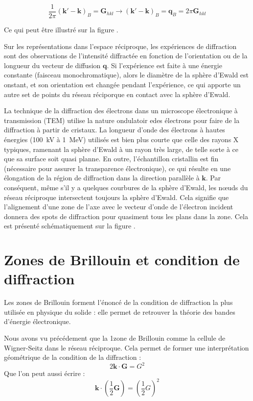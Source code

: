\begin{equation}
    \frac{1}{2\pi} (\mathbf{k'-k})_B = \mathbf{G}_{hkl} \rightarrow
    (\mathbf{k'-k})_B = \mathbf{q}_B = 2 \pi \mathbf{G}_{hkl}
\end{equation}

Ce qui peut être illustré sur la figure \TODO.

Sur les représentations dans l'espace réciproque, les expériences de diffraction 
sont des observations de l'intensité diffractée en fonction de l'orientation
ou de la longueur du vecteur de diffusion $\mathbf{q}$. Si l'expérience est faite
à une énergie constante (faisceau monochromatique), alors le diamètre de la
sphère d'Ewald est onstant, et son orientation est changée pendant l'expérience,
ce qui apporte un autre set de points du réseau réciporque en contact avec la
sphère d'Ewald.

La technique de la diffraction des électrons dans un microscope électronique à
transmission (TEM) utilise la nature ondulatoir edes électrons pour faire de la
diffraction à partir de cristaux. La longueur d'onde des électrons à hautes
énergies (\SI{100}{\kilo\volt} à \SI{1}{\mega\electronvolt}) utilisés est bien
plus courte que celle des rayons X typiques, ramenant la sphère d'Ewald à un
rayon très large, de telle sorte à ce que sa surface soit quasi planne.
En outre, l'échantillon cristallin est fin (nécessaire pour assurer la
transparence électronique), ce qui résulte en une élongation de la région de
diffraction dans la direction parallèle à $\mathbf{k}$.
Par conséquent, même s'il y a quelques courbures de la sphère d'Ewald, les nœuds
du réseau réciproque intersectent toujours la sphère d'Ewald. Cela signifie que
l'alignement d'une zone de l'axe avec le vecteur d'onde de l'électron
incident donnera des spots de diffraction pour quasiment tous les plans dans la
zone. Cela est présenté schématiquement sur la figure \TODO.



\section{Zones de Brillouin et condition de diffraction}

Les zones de Brillouin forment l'énoncé de la condition de diffraction la plus
utilisée en physique du solide : elle permet de retrouver la théorie des bandes
d'énergie électronique.

Nous avons vu précédement que la 1\iere zone de Brillouin comme la cellule de
Wigner-Seitz dans le réseau réciproque. Cela permet de former une interprétation
géométrique de la condition de la diffraction :
\begin{equation}
    2\mathbf{k} \cdot \mathbf{G} = G^2
\end{equation}
Que l'on peut aussi écrire :
\begin{equation}
    \mathbf{k} \cdot \left( \frac{1}{2} \mathbf{G} \right) = \left( \frac{1}{2} G \right)^2
\end{equation}

